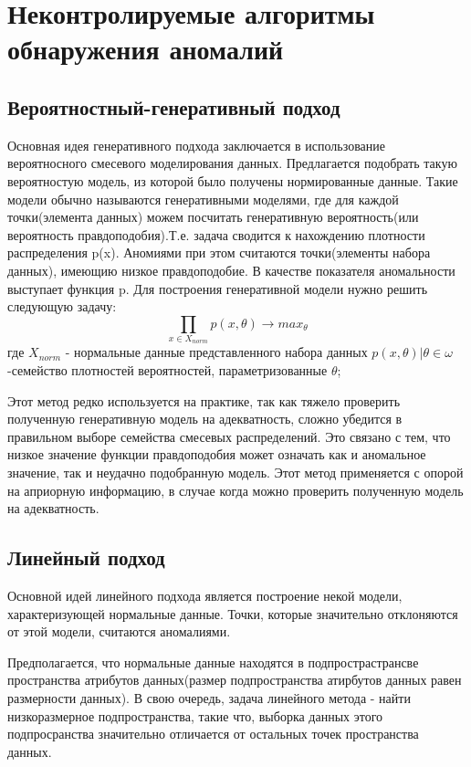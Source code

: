 \section{Неконтролируемые алгоритмы обнаружения аномалий}
\subsection{Вероятностный-генеративный подход}
Основная идея генеративного подхода заключается в использование вероятносного смесевого моделирования данных. Предлагается подобрать такую вероятностую модель, из которой было получены нормированные данные. Такие модели обычно называются генеративными моделями, где для каждой точки(элемента данных) можем посчитать генеративную вероятность(или вероятность правдоподобия).Т.е. задача  сводится к нахождению плотности распределения p(x). Аномиями при этом  считаются точки(элементы набора данных), имеющию низкое правдоподобие. В качестве показателя аномальности выступает функция p.
Для построения генеративной модели нужно решить следующую задачу:
	\begin{equation}
	\prod \limits_{x \in X_{norm}} p(x,\theta)  \rightarrow max_\theta
		\end{equation}
		где $ X_{norm}$ - нормальные данные представленного набора данных ${p(x,\theta)|\theta \in \omega}$ -семейство плотностей вероятностей, параметризованные $\theta$;
		
Этот метод редко используется на практике, так как тяжело проверить полученную генеративную модель на адекватность, сложно  убедится в правильном выборе семейства смесевых распределений. Это связано с тем, что низкое значение функции правдоподобия может означать как и аномальное значение, так и неудачно подобранную модель. Этот метод применяется с опорой на априорную информацию, в случае когда можно проверить полученную модель на адекватность.
\subsection{Линейный подход}
Основной идей линейного подхода является построение некой  модели, характеризующей нормальные данные. Точки, которые значительно отклоняются от этой модели, считаются аномалиями.

Предполагается, что нормальные данные  находятся в подпрострастрансве пространства атрибутов данных(размер подпространства атирбутов данных равен размерности данных). В свою очередь, задача линейного метода - найти низкоразмерное подпространства, такие что, выборка данных этого подпросранства значительно отличается от остальных точек пространства данных.

